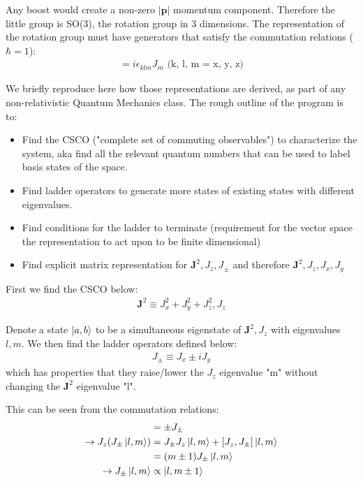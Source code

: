 \documentclass[12pt]{scrartcl}
\begin{document}
Any boost would create a non-zero $|\mathbf{p}|$ momentum component.  Therefore the little group is SO(3), the rotation group in 3 dimensions.  The representation of the rotation group must have generators that satisfy the commutation relations ($\hbar = 1$):
\begin{align}
[J_k, J_l] = i \epsilon_{k l m} J_m \text{ (k, l, m = x, y, z)}
\end{align}

We briefly reproduce here how those representations are derived, as part of any non-relativistic Quantum Mechanics class.  The rough outline of the program is to:
\begin{itemize}
\item Find the CSCO ("complete set of commuting observables") to characterize the system, aka find all the 
relevant quantum numbers that can be used to label basis states of the space.
\item Find ladder operators to generate more states of existing states with different eigenvalues.
\item Find conditions for the ladder to terminate (requirement for the vector space the representation to act upon to be finite dimensional)
\item Find explicit matrix representation for $\mathbf{J}^2, J_z, J_{\pm}$ and therefore
$\mathbf{J}^2, J_z, J_x, J_y$ 
\end{itemize}

First we find the CSCO below:
\begin{align}
\mathbf{J}^2 \equiv J_x^2 + J_y^2 + J_z^2, J_z
\end{align}

Denote a state $\ket{a, b}$ to be a simultaneous eigenstate of $\mathbf{J}^2, J_z$ with eigenvalues $l, m$.  We then find the ladder operators defined below:
\begin{align}
J_{\pm} \equiv J_{x} \pm i J_y
\end{align}
which has properties that they raise/lower the $J_z$ eigenvalue "m" without changing the $\mathbf{J}^2$ eigenvalue "l".

This can be seen from the commutation relations:
\begin{align}
[J_z, J_{\pm}] &= \pm J_\pm  \\
\rightarrow J_z (J_\pm \ket{l, m} ) &= J_{\pm} J_z \ket{l, m} +  [J_z, J_{\pm}]  \ket{l, m} \\
&= (m \pm 1) J_{\pm} \ket{l, m} \\
\rightarrow J_{\pm} \ket{l, m}  &\propto \ket{l, m \pm 1}
\end{align}
\end{document}

